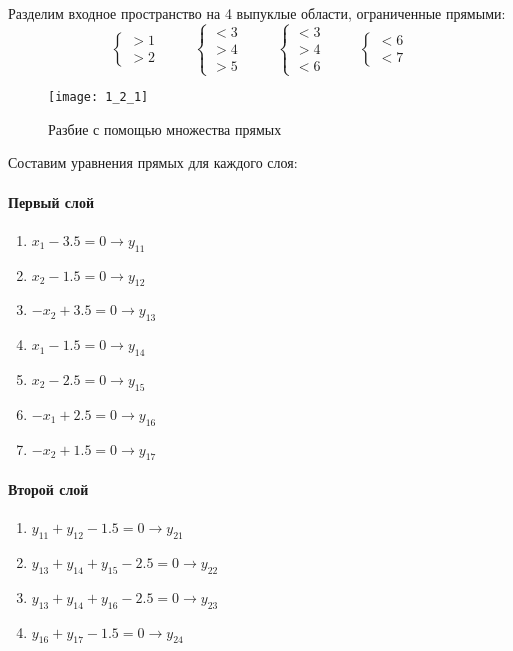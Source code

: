 Разделим входное пространство на 4 выпуклые области, ограниченные прямыми:
\begin{equation*}
	\begin{cases}
		>1\\
		>2
	\end{cases}
	\hspace{1cm}
	\begin{cases}
		<3\\
		>4\\
		>5
	\end{cases}
	\hspace{1cm}
	\begin{cases}
		<3\\
		>4\\
		<6
	\end{cases}
	\hspace{1cm}
	\begin{cases}
		<6\\
		<7
	\end{cases}
\end{equation*}

\begin{figure}[H]
\begin{center}
	\texttt{[image: 1\_2\_1]}
	\caption{Разбие с помощью множества прямых}
	\label{fig:rs}
\end{center}
\end{figure}

Составим уравнения прямых для каждого слоя:

\paragraph{Первый слой}
\begin{enumerate}
	\item $x_1 - 3.5 = 0 \rightarrow y_{11}$
	\item $x_2 - 1.5 = 0 \rightarrow y_{12}$
	\item $-x_2 + 3.5 = 0 \rightarrow y_{13}$
	\item $x_1 - 1.5 = 0 \rightarrow y_{14}$
	\item $x_2 - 2.5 = 0 \rightarrow y_{15}$
	\item $-x_1 + 2.5 = 0 \rightarrow y_{16}$
	\item $-x_2 + 1.5 = 0 \rightarrow y_{17}$
\end{enumerate}

\paragraph{Второй слой}
\begin{enumerate}
	\item $y_{11} + y_{12} - 1.5 = 0 \rightarrow y_{21}$
	\item $y_{13} + y_{14} + y_{15} - 2.5 = 0 \rightarrow y_{22}$
	\item $y_{13} + y_{14} + y_{16} - 2.5 = 0 \rightarrow y_{23}$
	\item $y_{16} + y_{17} - 1.5 = 0 \rightarrow y_{24}$
\end{enumerate}

